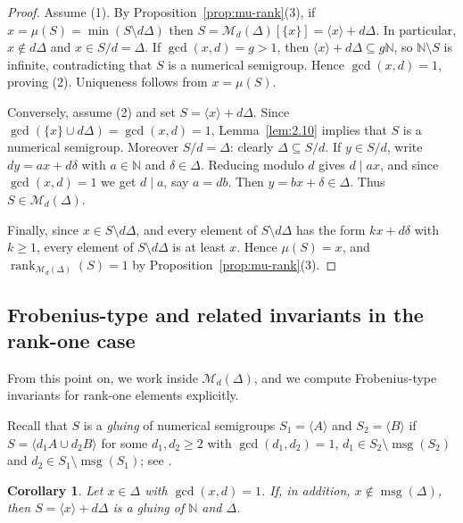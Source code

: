 \documentclass[12pt,a4paper]{amsart}
\newtheorem{corollary}[theorem]{Corollary}
\theoremstyle{definition}
\theoremstyle{remark}
\begin{document}
\begin{proof}
Assume (1). By Proposition~\ref{prop:mu-rank}(3), if $x=\mu(S)=\min(S\setminus d\Delta)$ then
$S=\mathcal{M}_d(\Delta)[\{x\}]=\langle x\rangle+d\Delta$. In particular, $x\notin d\Delta$ and $x\in S/d=\Delta$.
If $\gcd(x,d)=g>1$, then $\langle x\rangle+d\Delta\subseteq g\mathbb{N}$, so $\mathbb{N}\setminus S$ is infinite, contradicting that $S$ is a numerical semigroup.
Hence $\gcd(x,d)=1$, proving (2). Uniqueness follows from $x=\mu(S)$.

Conversely, assume (2) and set $S=\langle x\rangle+d\Delta$. Since $\gcd(\{x\}\cup d\Delta)=\gcd(x,d)=1$, Lemma~\ref{lem:2.10} implies that $S$ is a numerical semigroup.
Moreover $S/d=\Delta$: clearly $\Delta\subseteq S/d$. If $y\in S/d$, write $dy=ax+d\delta$ with $a\in\mathbb{N}$ and $\delta\in\Delta$.
Reducing modulo $d$ gives $d\mid ax$, and since $\gcd(x,d)=1$ we get $d\mid a$, say $a=db$. Then $y=bx+\delta\in\Delta$.
Thus $S\in\mathcal{M}_d(\Delta)$.

Finally, since $x\in S\setminus d\Delta$, and every element of $S\setminus d\Delta$
has the form $kx+d\delta$ with $k\ge 1$, every element of $S\setminus d\Delta$ is
at least $x$. Hence $\mu(S)=x$, and
$\operatorname{rank}_{\mathcal{M}_d(\Delta)}(S)=1$ by Proposition~\ref{prop:mu-rank}(3).
\end{proof}

\subsection{Frobenius-type and related invariants in the rank-one case}\label{subsec:rankone-invariants}

From this point on, we work inside $\mathcal{M}_d(\Delta)$, and we compute Frobenius-type invariants for rank-one elements explicitly.

Recall that $S$ is a \emph{gluing} of numerical semigroups $S_1=\langle A\rangle$ and $S_2=\langle B\rangle$ if
$S=\langle d_1A\cup d_2B\rangle$ for some $d_1,d_2\ge2$ with $\gcd(d_1,d_2)=1$, $d_1\in S_2\setminus\operatorname{msg}(S_2)$ and $d_2\in S_1\setminus\operatorname{msg}(S_1)$; see \cite[Chapter~8, Section~1]{book}.

\begin{corollary}\label{cor:gluing-N-Delta}
Let $x\in \Delta$ with $\gcd(x,d)=1$. If, in addition, $x\notin \operatorname{msg}(\Delta)$, then $S=\langle x\rangle+d\Delta$ is a gluing of $\mathbb{N}$ and $\Delta$.
\end{corollary}
\end{document}
